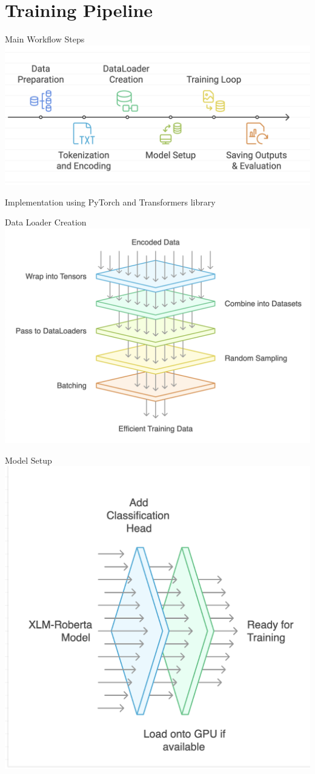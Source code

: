 \documentclass[aspectratio=169]{beamer}
\begin{document}
\section{Training Pipeline}
\begin{frame}{Main Workflow Steps}
  \centering
  \includegraphics[width=0.95\linewidth]{workflow.png}

\vspace{-0.5em}
\footnotesize{Implementation using PyTorch \parencite{paszke2019pytorchimperativestylehighperformance} and Transformers library \parencite{wolf-etal-2020-transformers}}
\end{frame}

\begin{frame}{Data Loader Creation}
  \centering
  \includegraphics[width=0.55\linewidth]{dataLoader.png}
\end{frame}

\begin{frame}{Model Setup}
  \centering
  \includegraphics[width=0.45\linewidth]{modelSetup.png}
\end{frame}
\end{document}
